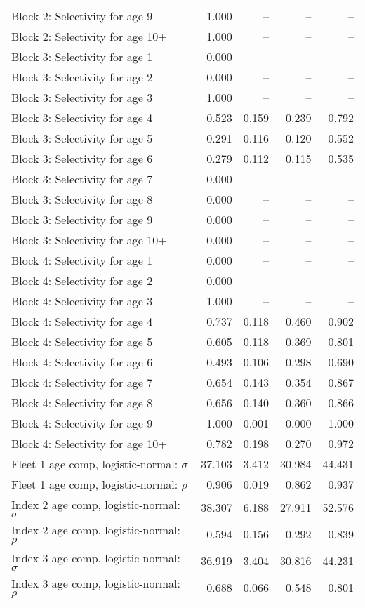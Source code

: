 \documentclass[
]{article}
\begin{document}
\begin{landscape}
\begin{longtable}[t]{lrrrr}
Block 2: Selectivity for age 9 & 1.000 & -- & -- & --\\
Block 2: Selectivity for age 10+ & 1.000 & -- & -- & --\\
Block 3: Selectivity for age 1 & 0.000 & -- & -- & --\\
Block 3: Selectivity for age 2 & 0.000 & -- & -- & --\\
\addlinespace
Block 3: Selectivity for age 3 & 1.000 & -- & -- & --\\
Block 3: Selectivity for age 4 & 0.523 & 0.159 & 0.239 & 0.792\\
Block 3: Selectivity for age 5 & 0.291 & 0.116 & 0.120 & 0.552\\
Block 3: Selectivity for age 6 & 0.279 & 0.112 & 0.115 & 0.535\\
Block 3: Selectivity for age 7 & 0.000 & -- & -- & --\\
\addlinespace
Block 3: Selectivity for age 8 & 0.000 & -- & -- & --\\
Block 3: Selectivity for age 9 & 0.000 & -- & -- & --\\
Block 3: Selectivity for age 10+ & 0.000 & -- & -- & --\\
Block 4: Selectivity for age 1 & 0.000 & -- & -- & --\\
Block 4: Selectivity for age 2 & 0.000 & -- & -- & --\\
\addlinespace
Block 4: Selectivity for age 3 & 1.000 & -- & -- & --\\
Block 4: Selectivity for age 4 & 0.737 & 0.118 & 0.460 & 0.902\\
Block 4: Selectivity for age 5 & 0.605 & 0.118 & 0.369 & 0.801\\
Block 4: Selectivity for age 6 & 0.493 & 0.106 & 0.298 & 0.690\\
Block 4: Selectivity for age 7 & 0.654 & 0.143 & 0.354 & 0.867\\
\addlinespace
Block 4: Selectivity for age 8 & 0.656 & 0.140 & 0.360 & 0.866\\
Block 4: Selectivity for age 9 & 1.000 & 0.001 & 0.000 & 1.000\\
Block 4: Selectivity for age 10+ & 0.782 & 0.198 & 0.270 & 0.972\\
Fleet 1 age comp, logistic-normal: $\sigma$ & 37.103 & 3.412 & 30.984 & 44.431\\
Fleet 1 age comp, logistic-normal: $\rho$ & 0.906 & 0.019 & 0.862 & 0.937\\
\addlinespace
Index 2 age comp, logistic-normal: $\sigma$ & 38.307 & 6.188 & 27.911 & 52.576\\
Index 2 age comp, logistic-normal: $\rho$ & 0.594 & 0.156 & 0.292 & 0.839\\
Index 3 age comp, logistic-normal: $\sigma$ & 36.919 & 3.404 & 30.816 & 44.231\\
Index 3 age comp, logistic-normal: $\rho$ & 0.688 & 0.066 & 0.548 & 0.801\\*
\end{longtable}
\end{landscape}
\end{document}
